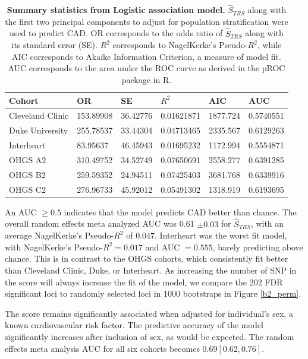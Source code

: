 \begin{table}[H]
\centering

\begin{tabular}{llllll}
\hline
Cohort           & OR        & SE       & $R^2$      & AIC      & AUC       \\ \hline
Cleveland Clinic & 153.89908 & 36.42776 & 0.01621871 & 1877.724 & 0.5740551 \\
Duke University  & 255.78537 & 33.44304 & 0.04713465 & 2335.567 & 0.6129263 \\
Interheart       & 83.95637  & 46.45943 & 0.01695232 & 1172.994 & 0.5554871 \\
OHGS A2          & 310.49752 & 34.52749 & 0.07650691 & 2558.277 & 0.6391285 \\
OHGS B2          & 259.59352 & 24.94511 & 0.07425403 & 3681.768 & 0.6339916 \\
OHGS C2          & 276.96733 & 45.92012 & 0.05491302 & 1318.919 & 0.6193695 \\ \hline
\end{tabular}
\caption[Summary statistics from Logistic association model for $\hat{S}_{TRS}$.]{\textbf{Summary statistics from Logistic association model.} $\hat{S}_{TRS}$ along with the first two principal components to adjust for population stratification were used to predict \ac{CAD}. OR corresponds to the odds ratio of $\hat{S}_{TRS}$ along with its standard error (SE). $R^2$ corresponds to NagelKerke's Pseudo-$R^2$, while AIC corresponds to Akaike Information Criterion, a measure of model fit. AUC corresponds to the area under the \ac{ROC} curve as derived in the pROC package in R.}
\label{trs}
\end{table}

An \ac{AUC} $\geq 0.5$ indicates that the model predicts CAD better than chance. The overall random effects meta analyzed \ac{AUC} was 0.61 $\pm 0.03$ for $\hat{S}_{TRS}$, with an average NagelKerke's Pseudo-$R^2$ of $0.047$. Interheart was the worst fit model, with NagelKerke's Pseudo-$R^2 = 0.017$ and \ac{AUC} $= 0.555$, barely predicting above chance. This is in contrast to the OHGS cohorts, which consistently fit better than Cleveland Clinic, Duke, or Interheart. As increasing the number of \acs{SNP} in the score will always increase the fit of the model, we compare the 202 FDR significant loci to randomly selected loci in 1000 bootstraps in Figure \ref{b2_perm}. 

The score remains significantly associated when adjusted for individual's sex, a known cardiovascular risk factor. The predictive accuracy of the model significantly increases after inclusion of sex, as would be expected. The random effects meta analysis \ac{AUC} for all six cohorts becomes $0.69[0.62, 0.76]$. 

